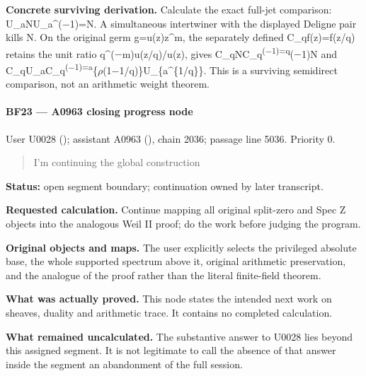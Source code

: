 \textbf{Concrete surviving derivation.} Calculate the exact full-jet
comparison:
U\_aNU\_a\textasciicircum{}(\allowbreak{}\ensuremath{−}\allowbreak{}1)=N.
A simultaneous intertwiner with the displayed Deligne pair kills N. On
the original germ g=u(z)z\^{}m, the separately defined C\_qf(z)=f(z/q)
retains the unit ratio
q\textasciicircum{}(\allowbreak{}\ensuremath{−}\allowbreak{}m)u(z/q)/u(z),
gives
C\_qNC\_q\textsuperscript{(\allowbreak{}\ensuremath{−}\allowbreak{}1)=q}(\allowbreak{}\ensuremath{−}\allowbreak{}1)N
and
C\_qU\_aC\_q\textsuperscript{(\allowbreak{}\ensuremath{−}\allowbreak{}1)=a}\{\allowbreak{}\ensuremath{ρ}\allowbreak{}(1\allowbreak{}\ensuremath{−}\allowbreak{}1/q)\}U\_\{a\textasciicircum{}\{1/q\}\}.
This is a surviving semidirect comparison, not an arithmetic weight
theorem.

\paragraph{BF23 --- A0963 closing progress
node}\label{bf23-a0963-closing-progress-node}

User U0028 (\protect{});
assistant A0963 (\protect{}),
chain 2036; passage line 5036. Priority 0.

\begin{quote}
I'm continuing the global construction
\end{quote}

\textbf{Status:} open segment boundary; continuation owned by later
transcript.

\textbf{Requested calculation.} Continue mapping all original split-zero
and Spec Z objects into the analogous Weil II proof; do the work before
judging the program.

\textbf{Original objects and maps.} The user explicitly selects the
privileged absolute base, the whole supported spectrum above it,
original arithmetic preservation, and the analogue of the proof rather
than the literal finite-field theorem.

\textbf{What was actually proved.} This node states the intended next
work on sheaves, duality and arithmetic trace. It contains no completed
calculation.

\textbf{What remained uncalculated.} The substantive answer to U0028
lies beyond this assigned segment. It is not legitimate to call the
absence of that answer inside the segment an abandonment of the full
session.

